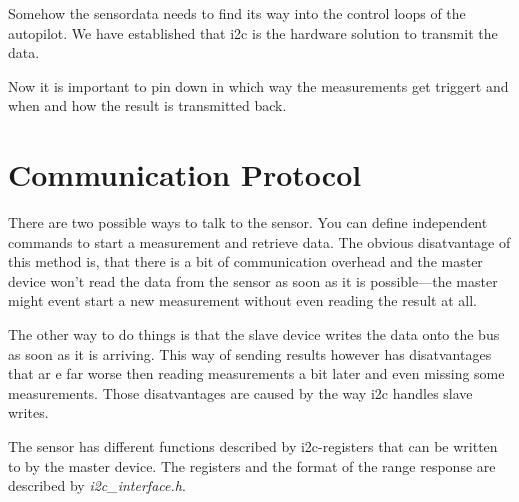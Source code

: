 
Somehow the sensordata needs to find its way into the control loops of the autopilot.
We have established that i2c is the hardware solution to transmit the data.

Now it is important to pin down in which way the measurements get triggert and when and how the result is transmitted back.

\section{Communication Protocol}

There are two possible ways to talk to the sensor.
You can define independent commands to start a measurement and retrieve data.
The obvious disatvantage of this method is, that there is a bit of communication overhead and the master device won't read the data from the sensor as soon as it is possible—the master might event start a new measurement without even reading the result at all.

The other way to do things is that the slave device writes the data onto the bus as soon as it is arriving.
This way of sending results however has disatvantages that ar e far worse then reading measurements a bit later and even missing some measurements.
Those disatvantages are caused by the way i2c handles slave writes.

The sensor has different functions described by i2c-registers that can be written to by the master device.
The registers and the format of the range response are described by \emph{i2c\_interface.h}.


